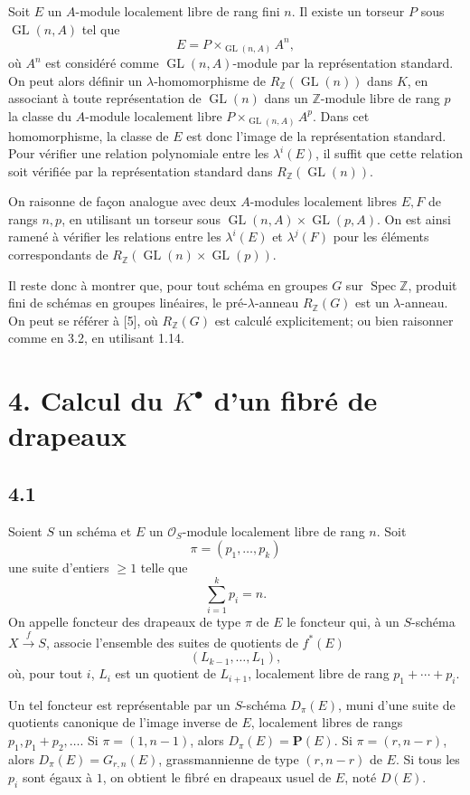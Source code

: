 \documentclass[11pt]{article}
\newcommand{\Spec}{\operatorname{Spec}}
\providecommand{\GL}{\operatorname{GL}}
\begin{document}
Soit \(E\) un \(A\)-module localement libre de rang fini \(n\). Il existe un torseur \(P\) sous \(\GL(n,A)\) tel que
\[
  E=P\times_{\GL(n,A)}A^n,
\]
où \(A^n\) est considéré comme \(\GL(n,A)\)-module par la représentation standard. On peut alors définir un \(\lambda\)-homomorphisme de \(R_{\mathbb Z}(\GL(n))\) dans \(K\), en associant à toute représentation de \(\GL(n)\) dans un \(\mathbb Z\)-module libre de rang \(p\) la classe du \(A\)-module localement libre \(P\times_{\GL(n,A)}A^p\). Dans cet homomorphisme, la classe de \(E\) est donc l'image de la représentation standard. Pour vérifier une relation polynomiale entre les \(\lambda^i(E)\), il suffit que cette relation soit vérifiée par la représentation standard dans \(R_{\mathbb Z}(\GL(n))\).

On raisonne de façon analogue avec deux \(A\)-modules localement libres \(E,F\) de rangs \(n,p\), en utilisant un torseur sous \(\GL(n,A)\times\GL(p,A)\). On est ainsi ramené à vérifier les relations entre les \(\lambda^i(E)\) et \(\lambda^j(F)\) pour les éléments correspondants de \(R_{\mathbb Z}(\GL(n)\times\GL(p))\).

Il reste donc à montrer que, pour tout schéma en groupes \(G\) sur \(\Spec\mathbb Z\), produit fini de schémas en groupes linéaires, le pré-\(\lambda\)-anneau \(R_{\mathbb Z}(G)\) est un \(\lambda\)-anneau. On peut se référer à [5], où \(R_{\mathbb Z}(G)\) est calculé explicitement; ou bien raisonner comme en 3.2, en utilisant 1.14.

\section*{4. Calcul du \(K^\bullet\) d'un fibré de drapeaux}

\subsection*{4.1}
Soient \(S\) un schéma et \(E\) un \(\mathcal O_S\)-module localement libre de rang \(n\). Soit
\[
  \pi=(p_1,\ldots,p_k)
\]
une suite d'entiers \(\geq1\) telle que
\[
  \sum_{i=1}^{k}p_i=n.
\]
On appelle foncteur des drapeaux de type \(\pi\) de \(E\) le foncteur qui, à un \(S\)-schéma \(X\xrightarrow f S\), associe l'ensemble des suites de quotients de \(f^*(E)\)
\[
  (L_{k-1},\ldots,L_1),
\]
où, pour tout \(i\), \(L_i\) est un quotient de \(L_{i+1}\), localement libre de rang \(p_1+\cdots+p_i\).

Un tel foncteur est représentable par un \(S\)-schéma \(D_\pi(E)\), muni d'une suite de quotients canonique de l'image inverse de \(E\), localement libres de rangs \(p_1,p_1+p_2,\ldots\). Si \(\pi=(1,n-1)\), alors \(D_\pi(E)=\mathbf P(E)\). Si \(\pi=(r,n-r)\), alors \(D_\pi(E)=G_{r,n}(E)\), grassmannienne de type \((r,n-r)\) de \(E\). Si tous les \(p_i\) sont égaux à \(1\), on obtient le fibré en drapeaux usuel de \(E\), noté \(D(E)\).
\end{document}
